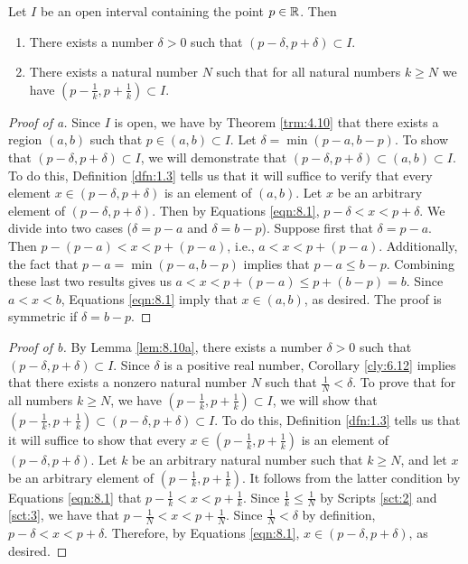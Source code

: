 \documentclass[../main.tex]{subfiles}
\begin{document}
\begin{lemma}\label{lem:8.10}
    Let $I$ be an open interval containing the point $p\in\mathbb{R}$. Then
    \begin{enumerate}[label={\alph*\textup{)}},ref={\thelemma\alph*}]
        \item \label{lem:8.10a}There exists a number $\delta>0$ such that $(p-\delta,p+\delta)\subset I$.
        \item \label{lem:8.10b}There exists a natural number $N$ such that for all natural numbers $k\geq N$ we have $(p-\frac{1}{k},p+\frac{1}{k})\subset I$.
    \end{enumerate}
    \begin{proof}[Proof of a]
        Since $I$ is open, we have by Theorem \ref{trm:4.10} that there exists a region $(a,b)$ such that $p\in(a,b)\subset I$. Let $\delta=\min(p-a,b-p)$. To show that $(p-\delta,p+\delta)\subset I$, we will demonstrate that $(p-\delta,p+\delta)\subset(a,b)\subset I$. To do this, Definition \ref{dfn:1.3} tells us that it will suffice to verify that every element $x\in(p-\delta,p+\delta)$ is an element of $(a,b)$. Let $x$ be an arbitrary element of $(p-\delta,p+\delta)$. Then by Equations \ref{eqn:8.1}, $p-\delta<x<p+\delta$. We divide into two cases ($\delta=p-a$ and $\delta=b-p$). Suppose first that $\delta=p-a$. Then $p-(p-a)<x<p+(p-a)$, i.e., $a<x<p+(p-a)$. Additionally, the fact that $p-a=\min(p-a,b-p)$ implies that $p-a\leq b-p$. Combining these last two results gives us $a<x<p+(p-a)\leq p+(b-p)=b$. Since $a<x<b$, Equations \ref{eqn:8.1} imply that $x\in(a,b)$, as desired. The proof is symmetric if $\delta=b-p$.
    \end{proof}
    \begin{proof}[Proof of b]
        By Lemma \ref{lem:8.10a}, there exists a number $\delta>0$ such that $(p-\delta,p+\delta)\subset I$. Since $\delta$ is a positive real number, Corollary \ref{cly:6.12} implies that there exists a nonzero natural number $N$ such that $\frac{1}{N}<\delta$. To prove that for all numbers $k\geq N$, we have $(p-\frac{1}{k},p+\frac{1}{k})\subset I$, we will show that $(p-\frac{1}{k},p+\frac{1}{k})\subset(p-\delta,p+\delta)\subset I$. To do this, Definition \ref{dfn:1.3} tells us that it will suffice to show that every $x\in(p-\frac{1}{k},p+\frac{1}{k})$ is an element of $(p-\delta,p+\delta)$. Let $k$ be an arbitrary natural number such that $k\geq N$, and let $x$ be an arbitrary element of $(p-\frac{1}{k},p+\frac{1}{k})$. It follows from the latter condition by Equations \ref{eqn:8.1} that $p-\frac{1}{k}<x<p+\frac{1}{k}$. Since $\frac{1}{k}\leq\frac{1}{N}$ by Scripts \ref{sct:2} and \ref{sct:3}, we have that $p-\frac{1}{N}<x<p+\frac{1}{N}$. Since $\frac{1}{N}<\delta$ by definition, $p-\delta<x<p+\delta$. Therefore, by Equations \ref{eqn:8.1}, $x\in(p-\delta,p+\delta)$, as desired.
    \end{proof}
\end{lemma}
\end{document}
